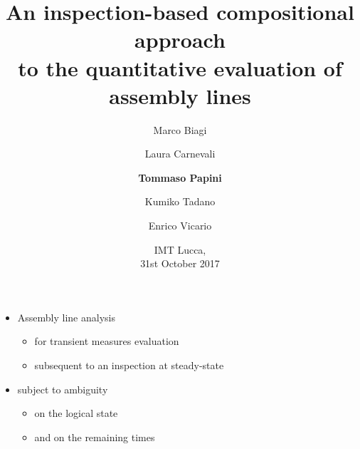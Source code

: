 
\title[An inspection-based compositional approach to the quantitative evaluation of assembly lines]{
  An inspection-based compositional approach\\
  to the quantitative evaluation of assembly lines
}
\author{
  Marco Biagi \and Laura Carnevali\\
  \and \textbf{Tommaso Papini} \and Kumiko Tadano \and Enrico Vicario
}
\date{
  IMT Lucca,\\
  31st October 2017
}
  
\begin{frame}
  \titlepage
  
  \begin{itemize}
    \item Assembly line analysis
    \begin{itemize}
      \item for transient measures evaluation
      \item subsequent to an inspection at steady-state
    \end{itemize}
    \item subject to ambiguity
    \begin{itemize}
      \item on the logical state
      \item and on the remaining times
    \end{itemize}
  \end{itemize}
\end{frame}